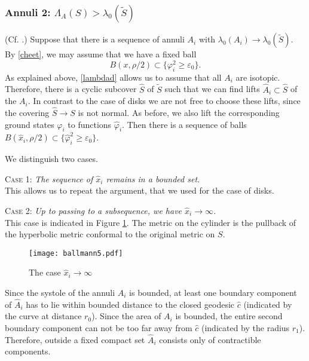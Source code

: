 \documentclass[a4paper,11pt]{amsart}
\numberwithin{equation}{section}
\theoremstyle{definition}
\def\ve{\varepsilon}
\begin{document}
\subsubsection{Annuli 2: $\Lambda_A(S)>\lambda_0(\tilde S)$} (Cf. \cite[Theorem 7.3]{BMM3}.)
Suppose that there is a sequence of annuli $A_i$ with $\lambda_0(A_i) \to \lambda_0(\tilde S)$.
By \cref{cheet}, we may assume that we have a fixed ball 
\begin{equation*}
B(x,\rho/2) \subset \{ \varphi_i^2 \geq \ve_0\}.
\end{equation*}
As explained above, \cref{lambdad} allows us to assume that all $A_i$ are isotopic.
Therefore, there is a cyclic subcover $\hat S$ of $\tilde S$ such that we can find lifts
$\hat A_i \subset \hat S$ of the $A_i.$
In contrast to the case of disks we are not free to choose these lifts, since the covering
$\hat S \to S$ is not normal. 
As before, we also lift the corresponding ground states $\varphi_i$ to functions $\hat \varphi_i$.
Then there is a sequence of balls $B(\hat x_i,\rho/2) \subset \{\hat\varphi_i^2 \geq \ve_0\}$.

We distinguish two cases.

\textsc{Case 1:} 
\textit{The sequence of $\hat x_i$ remains in a bounded set.}
\\
This allows us to repeat the argument, that we used for the case of disks.

\textsc{Case 2:} 
\textit{Up to passing to a subsequence, we have $\hat x_i \to \infty$.}
\\
This case is indicated in Figure \ref{fig}.
The metric on the cylinder is the pullback of the hyperbolic metric conformal to the
original metric on $S$.

\begin{figure}
\texttt{[image: ballmann5.pdf]}
\caption{The case $\hat x_i \to \infty$}\label{fig}
\end{figure}
 
Since the systole of the annuli $A_i$ is bounded, at least one boundary component of $\hat A_i$ has to lie within bounded distance to the closed geodesic $\hat c$ (indicated by the curve at distance $r_0$).
Since the area of $A_i$ is bounded, the entire second boundary component can not be too far away from $\hat c$ (indicated by the radius $r_1$).
Therefore, outside a fixed compact set $\hat A_i$ consists only of contractible components.
\end{document}
